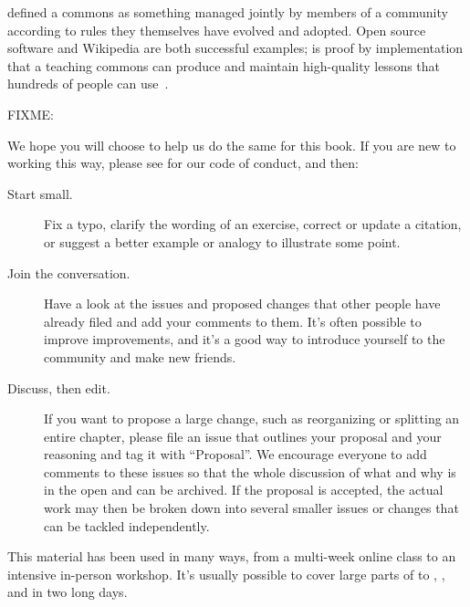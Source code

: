
 defined a commons as
something managed jointly by members of a community
according to rules they themselves have evolved and adopted.
Open source software and Wikipedia are both successful examples;
 is proof by implementation that
a teaching commons can produce and maintain high-quality lessons
that hundreds of people can use~\cite{Wils2016}.

FIXME: \cite{Deve2018}

We hope you will choose to help us do the same for this book.
If you are new to working this way,
please see  for our code of conduct,
and then:

\begin{description}

\item[Start small.]
  Fix a typo,
  clarify the wording of an exercise,
  correct or update a citation,
  or suggest a better example or analogy to illustrate some point.

\item[Join the conversation.]
  Have a look at the issues and proposed changes that other people have already filed
  and add your comments to them.
  It's often possible to improve improvements,
  and it's a good way to introduce yourself to the community and make new friends.

\item[Discuss, then edit.]
  If you want to propose a large change,
  such as reorganizing or splitting an entire chapter,
  please file an issue that outlines your proposal and your reasoning and tag it with ``Proposal''.
  We encourage everyone to add comments to these issues
  so that the whole discussion of what and why is in the open and can be archived.
  If the proposal is accepted,
  the actual work may then be broken down into several smaller issues or changes
  that can be tackled independently.

\end{description}


This material has been used in many ways,
from a multi-week online class to an intensive in-person workshop.
It's usually possible to cover large parts of  to ,
,
and  in two long days.

